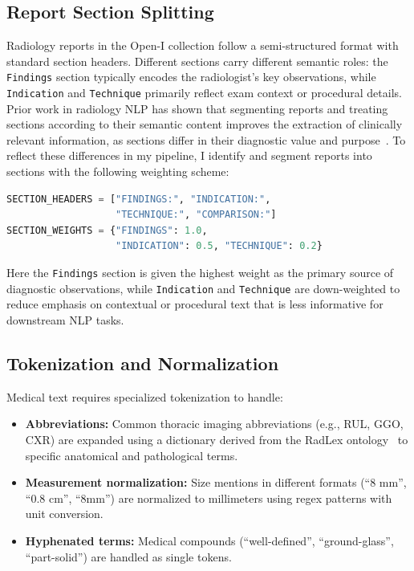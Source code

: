 \documentclass[12pt]{article}
\begin{document}
\subsection{Report Section Splitting}
\label{subsec:section-splitting}

Radiology reports in the Open-I collection follow a semi-structured format with standard section headers.
Different sections carry different semantic roles: the \texttt{Findings} section typically encodes the radiologist’s key observations, while \texttt{Indication} and \texttt{Technique} primarily reflect exam context or procedural details.
Prior work in radiology NLP has shown that segmenting reports and treating sections according to their semantic content improves the extraction of clinically relevant information, as sections differ in their diagnostic value and purpose~\cite{casey2021nlpradiology, grey2021sectionsegmentation}.
To reflect these differences in my pipeline, I identify and segment reports into sections with the following weighting scheme:

\begin{lstlisting}[language=Python, caption={Section splitting with weighting.}]
SECTION_HEADERS = ["FINDINGS:", "INDICATION:",
                   "TECHNIQUE:", "COMPARISON:"]
SECTION_WEIGHTS = {"FINDINGS": 1.0,
                   "INDICATION": 0.5, "TECHNIQUE": 0.2}
\end{lstlisting}

Here the \texttt{Findings} section is given the highest weight as the primary source of diagnostic observations, while \texttt{Indication} and \texttt{Technique} are down-weighted to reduce emphasis on contextual or procedural text that is less informative for downstream NLP tasks.


\subsection{Tokenization and Normalization}
\label{subsec:tokenization}

Medical text requires specialized tokenization to handle:
\begin{itemize}
    \item \textbf{Abbreviations:} Common thoracic imaging abbreviations (e.g., RUL, GGO, CXR) are expanded using a dictionary derived from the RadLex ontology~\cite{langlotz2006radlex} to specific anatomical and pathological terms.
    \item \textbf{Measurement normalization:} Size mentions in different formats (``8 mm'', ``0.8 cm'', ``8mm'') are normalized to millimeters using regex patterns with unit conversion.
    \item \textbf{Hyphenated terms:} Medical compounds (``well-defined'', ``ground-glass'', ``part-solid'') are handled as single tokens.
\end{itemize}
\end{document}
